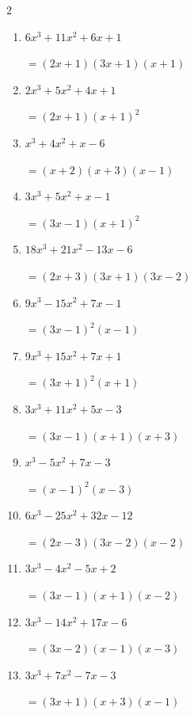 \begin{multicols}{2}
\begin{enumerate}
        $=(2x+1)(x+1) ^{ 2 }$

  \item $6x^{3}+11x^{2}+6x+1$

        $=(2x+1)(3x+1)(x+1)$

\columnbreak %

  \item $2x^{3}+5x^{2}+4x+1$

        $=(2x+1)(x+1) ^{ 2 }$

  \item $x^{3}+4x^{2}+x-6$

        $=(x+2)(x+3)(x-1)$

  \item $3x^{3}+5x^{2}+x-1$

        $=(3x-1)(x+1) ^{ 2 }$

  \item $18x^{3}+21x^{2}-13x-6$

        $=(2x+3)(3x+1)(3x-2)$

  \item $9x^{3}-15x^{2}+7x-1$

        $=(3x-1) ^{ 2 }(x-1)$

\columnbreak %

\resetques

  \item $9x^{3}+15x^{2}+7x+1$

        $=(3x+1) ^{ 2 }(x+1)$

  \item $3x^{3}+11x^{2}+5x-3$

        $=(3x-1)(x+1)(x+3)$

  \item $x^{3}-5x^{2}+7x-3$

        $=(x-1) ^{ 2 }(x-3)$

  \item $6x^{3}-25x^{2}+32x-12$

        $=(2x-3)(3x-2)(x-2)$

  \item $3x^{3}-4x^{2}-5x+2$

        $=(3x-1)(x+1)(x-2)$

\columnbreak %

  \item $3x^{3}-14x^{2}+17x-6$

        $=(3x-2)(x-1)(x-3)$

  \item $3x^{3}+7x^{2}-7x-3$

        $=(3x+1)(x+3)(x-1)$


\end{enumerate}
\end{multicols}
